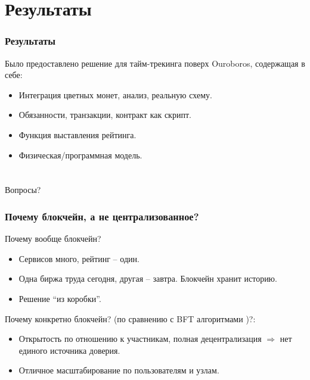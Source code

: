 \documentclass[11pt,handout,pdf,hyperref={unicode}]{beamer}
\newcommand{\backupbegin}{
   \newcounter{finalframe}
   \setcounter{finalframe}{\value{framenumber}}
}
\begin{document}
\section{Результаты}

\begin{frame}
  \frametitle{Результаты}

  Было предоставлено решение для тайм-трекинга поверх Ouroboros,
  содержащая в себе:
  \begin{itemize}
  \item Интеграция цветных монет, анализ, реальную схему.
  \item Обязанности, транзакции, контракт как скрипт.
  \item Функция выставления рейтинга.
  \item Физическая/программная модель.
  \end{itemize}
\end{frame}

\backupbegin
\section{}

\begin{frame}

  \begin{center}
    \Huge Вопросы?
  \end{center}

\end{frame}


\begin{frame}
  \frametitle{Почему блокчейн, а не централизованное?}

  Почему вообще блокчейн?
  \begin{itemize}
  \item Сервисов много, рейтинг -- один.
  \item Одна биржа труда сегодня, другая -- завтра. Блокчейн хранит историю.
  \item Решение ``из коробки''.
  \end{itemize}

  Почему конкретно блокчейн? (по сравнению с BFT алгоритмами
  \parencite{powbftquest})?:
  \begin{itemize}
  \item Открытость по отношению к участникам, полная децентрализация
    $\Rightarrow$ нет единого источника доверия.
  \item Отличное масштабирование по пользователям и узлам.
  \end{itemize}
\end{frame}
\end{document}
